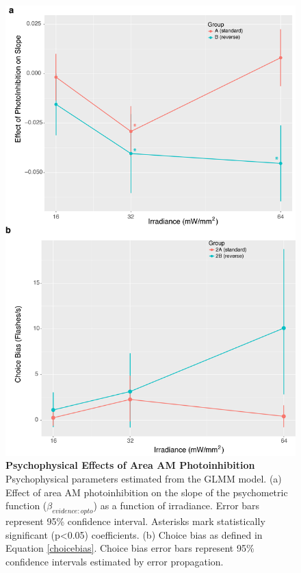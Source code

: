 \begin{figure}
  \centering
   \includegraphics[width=\textwidth,height=0.9\textwidth,keepaspectratio]{Figures/chapter4/glmm_pmf_effects.png}
  \caption[Psychophysical Effects of Area AM Photoinhibition]{\textbf{Psychophysical Effects of Area AM Photoinhibition} Psychophysical parameters estimated from the GLMM model. (a) Effect of area AM photoinhibition on the slope of the psychometric function ($\beta_{evidence:opto}$) as a function of irradiance. Error bars represent 95\% confidence interval. Asterisks mark statistically significant (p<0.05) coefficients. (b) Choice bias as defined in Equation \ref{choicebias}. Choice bias error bars represent 95\% confidence intervals estimated by error propagation. }
   \label{fig:amGLMMparams}
\end{figure}

